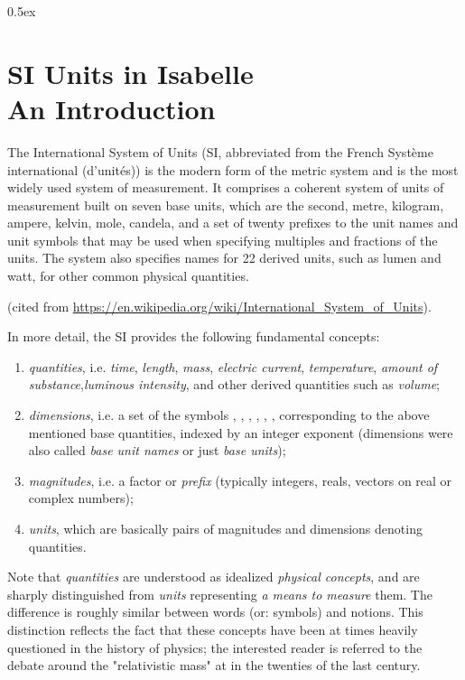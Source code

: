\documentclass[11pt,a4paper]{book}
\begin{document}
\tableofcontents

\parindent 0pt\parskip 0.5ex


\chapter{SI Units in Isabelle \\ An Introduction}

The International System of Units (SI, abbreviated from the French
Système international (d'unités)) is the modern form of the metric
system and is the most widely used system of measurement. It comprises
a coherent system of units of measurement built on seven base units,
which are the second, metre, kilogram, ampere, kelvin, mole, candela,
and a set of twenty prefixes to the unit names and unit symbols that
may be used when specifying multiples and fractions of the units.
The system also specifies names for 22 derived units, such as lumen and
watt, for other common physical quantities.

(cited from \url{https://en.wikipedia.org/wiki/International_System_of_Units}).

In more detail, the SI provides the following fundamental concepts:

%
\begin{enumerate}%
\item \emph{quantities}, i.e. \emph{time}, \emph{length}, \emph{mass}, \emph{electric current},
\emph{temperature}, \emph{amount of substance},\emph{luminous intensity},
and other derived quantities such as \emph{volume};

\item \emph{dimensions}, i.e. a set of the symbols  , , , ,  \isa{{\isasymTheta}}, ,   corresponding
to the above mentioned base quantities,  indexed by an integer exponent
(dimensions were also called \emph{base unit names} or just \emph{base units});

\item \emph{magnitudes}, i.e. a factor or \emph{prefix}
(typically integers, reals, vectors on real or complex numbers);

\item \emph{units}, which are basically pairs of magnitudes and dimensions denoting quantities.
\end{enumerate}

Note that \emph{quantities} are understood as idealized  \emph{physical concepts}, and are sharply 
distinguished from  \emph{units} representing \emph{a means to measure} them. The difference is 
roughly similar between words (or: symbols) and notions. This distinction reflects the fact that
these concepts have been at times heavily questioned in the history of physics; the interested
reader is referred to the debate around the "relativistic mass" at in the twenties of the last century.
\end{document}

